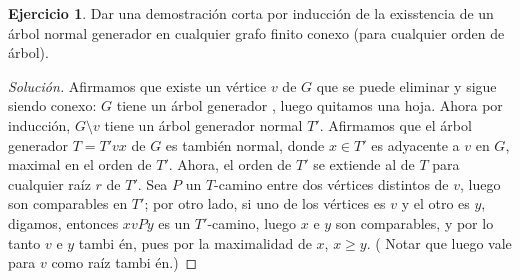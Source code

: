 \documentclass[12pt]{report}
\theoremstyle{plain}
\theoremstyle{definition}
\newtheorem{exercise}[theorem]{Ejercicio}
\newenvironment{solution}{\begin{proof}[Solución]}{\end{proof}}
\begin{document}
\begin{exercise}
    Dar una demostración corta por inducción de la exisstencia de un árbol normal generador en cualquier grafo finito
     conexo (para cualquier orden de árbol).
\end{exercise}
\begin{solution}
    Afirmamos que existe un vértice $v$ de $G$ que se puede eliminar y sigue siendo conexo: $G$ tiene un árbol generador
    , luego quitamos una hoja. Ahora por inducción, $G \setminus v$ tiene un árbol generador normal $T'$. Afirmamos
    que el árbol generador $T = T' vx$ de $G$ es también normal, donde $x \in T'$ es adyacente a $v$ en $G$, maximal
    en el orden de $T'$.
    Ahora, el orden de $T'$ se extiende al de $T$ para cualquier raíz $r$ de $T'$. Sea $P$ un $T$-camino entre dos vértices
    distintos de $v$, luego son comparables en $T'$; por otro lado, si uno de los vértices es $v$ y el otro es $y$,
    digamos, entonces $x v P y$ es un $T'$-camino, luego $x$ e $y$ son comparables, y por lo tanto $v$ e $y$ tambi
    én, pues por la maximalidad de $x$, $x \geq y$. (
    Notar
    que
    luego
    vale para $v$
    como raíz
    tambi
    én.)
\end{solution}
\end{document}
